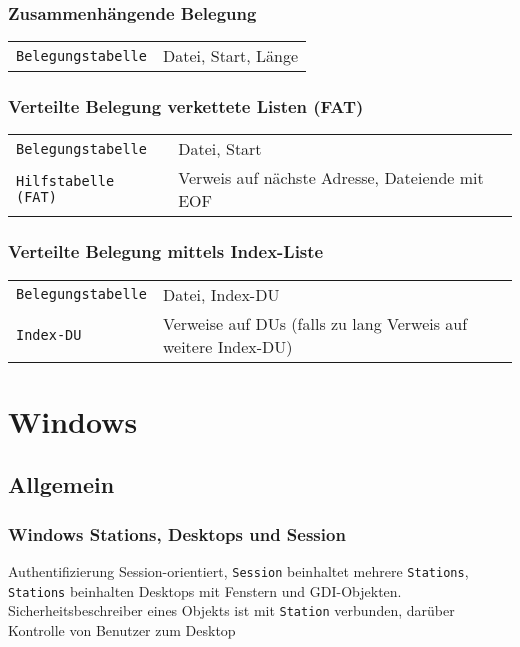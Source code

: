 \subsubsection{Zusammenhängende Belegung}
\begin{tabular}{@{}p{\the\MyLen}@{}%
		@{}p{\linewidth-\the\MyLen}@{}}
\texttt{Belegungstabelle} & Datei, Start, Länge\\
\end{tabular}

\subsubsection{Verteilte Belegung verkettete Listen (FAT)}
\begin{tabular}{@{}p{\the\MyLen}@{}%
		@{}p{\linewidth-\the\MyLen}@{}}
	\texttt{Belegungstabelle} & Datei, Start\\
	\texttt{Hilfstabelle (FAT)} & Verweis auf nächste Adresse, Dateiende mit EOF\\
\end{tabular}

\subsubsection{Verteilte Belegung mittels Index-Liste}
\begin{tabular}{@{}p{\the\MyLen}@{}%
		@{}p{\linewidth-\the\MyLen}@{}}
	\texttt{Belegungstabelle} & Datei, Index-DU\\
	\texttt{Index-DU} & Verweise auf DUs (falls zu lang Verweis auf weitere Index-DU)\\
\end{tabular}


\section{Windows}

\subsection{Allgemein}
\subsubsection{Windows Stations, Desktops und Session}
Authentifizierung Session-orientiert, \texttt{Session} beinhaltet mehrere \texttt{Stations}, \texttt{Stations} beinhalten Desktops mit Fenstern und GDI-Objekten. Sicherheitsbeschreiber eines Objekts ist mit \texttt{Station} verbunden, darüber Kontrolle von Benutzer zum Desktop

